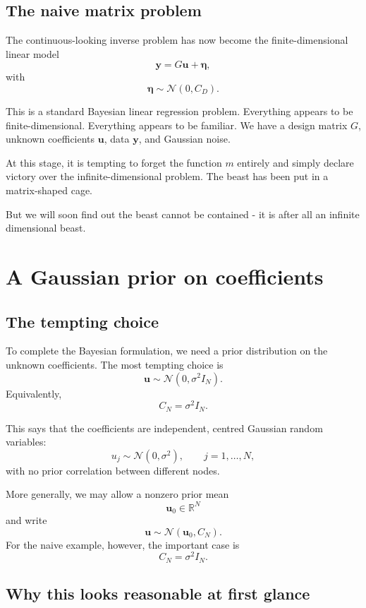 \documentclass[11pt,a4paper]{book}
\begin{document}
\subsection{The naive matrix problem}

The continuous-looking inverse problem has now become the finite-dimensional
linear model
\[
    \bm{y} = G \bm{u} + \bm{\eta},
\]
with
\[
    \bm{\eta} \sim \mathcal{N}(0,C_D).
\]

This is a standard Bayesian linear regression problem. Everything appears to be
finite-dimensional. Everything appears to be familiar. We have a design matrix
$G$, unknown coefficients $\bm{u}$, data $\bm{y}$, and Gaussian noise.

At this stage, it is tempting to forget the function $m$ entirely and simply
declare victory over the infinite-dimensional problem. The beast has been put
in a matrix-shaped cage.

But we will soon find out the beast cannot be contained - it is after all an infinite dimensional beast.

\section{A Gaussian prior on coefficients}

\subsection{The tempting choice}

To complete the Bayesian formulation, we need a prior distribution on the
unknown coefficients. The most tempting choice is
\[
    \bm{u} \sim \mathcal{N}(0,\sigma^2 I_N).
\]
Equivalently,
\[
    C_N = \sigma^2 I_N.
\]

This says that the coefficients are independent, centred Gaussian random
variables:
\[
    u_j \sim \mathcal{N}(0,\sigma^2),
    \qquad
    j=1,\ldots,N,
\]
with no prior correlation between different nodes.

More generally, we may allow a nonzero prior mean
\[
    \bm{u}_0 \in \mathbb{R}^N
\]
and write
\[
    \bm{u} \sim \mathcal{N}(\bm{u}_0,C_N).
\]
For the naive example, however, the important case is
\[
    C_N = \sigma^2 I_N.
\]

\subsection{Why this looks reasonable at first glance}
\end{document}
